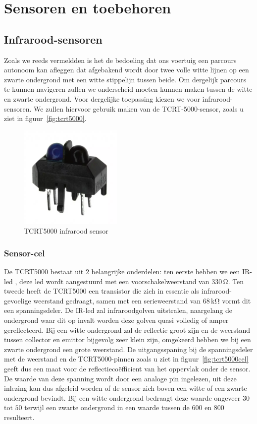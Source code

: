  
\section{Sensoren en toebehoren}
\subsection{Infrarood-sensoren}
Zoals we reeds vermeldden is het de bedoeling dat ons voertuig een parcours autonoom kan afleggen dat afgebakend wordt door twee volle witte lijnen op een zwarte ondergrond met een witte stippelijn tussen beide. Om dergelijk parcours te kunnen navigeren zullen we onderscheid moeten kunnen maken tussen de witte en zwarte ondergrond. Voor dergelijke toepassing kiezen we voor infrarood-sensoren. We zullen hiervoor gebruik maken van de TCRT-5000-sensor, zoals u ziet in figuur~\vref{fig:tcrt5000}. 

\begin{figure}[H]
	\centering
	\includegraphics[height=5cm]{tcrt5000.png}
	\caption{TCRT5000 infrarood sensor\label{fig:tcrt5000}}
\end{figure}

\subsubsection*{Sensor-cel}
De TCRT5000 bestaat uit 2 belangrijke onderdelen: ten eerste hebben we een IR-led , deze led wordt aangestuurd met een voorschakelweerstand van $330\,\mathrm{\Omega}$. Ten tweede heeft de TCRT5000 een transistor die zich in essentie als infrarood-gevoelige weerstand gedraagt, samen met een serieweerstand van $68\,\mathrm{k\Omega}$ vormt dit een spanningsdeler. De IR-led zal infraroodgolven uitstralen, naargelang de ondergrond waar dit op invalt worden deze golven quasi volledig of amper gereflecteerd. Bij een witte ondergrond zal de reflectie groot zijn en de weerstand tussen collector en emittor bijgevolg zeer klein zijn, omgekeerd hebben we bij een zwarte ondergrond een grote weerstand. De uitgangsspaning bij de spanningsdeler met de weerstand en de TCRT5000-pinnen zoals u ziet in figuur~\vref{fig:tcrt5000cel} geeft dus een maat voor de reflectieco\"efficient van het oppervlak onder de sensor. De waarde van deze spanning wordt door een analoge pin ingelezen, uit deze inlezing kan dus afgeleid worden of de sensor zich boven een witte of een zwarte ondergrond bevindt. Bij een witte ondergrond bedraagt deze waarde ongeveer $30$ tot $50$ terwijl een zwarte ondergrond in een waarde tussen de $600$ en $800$ resulteert.

